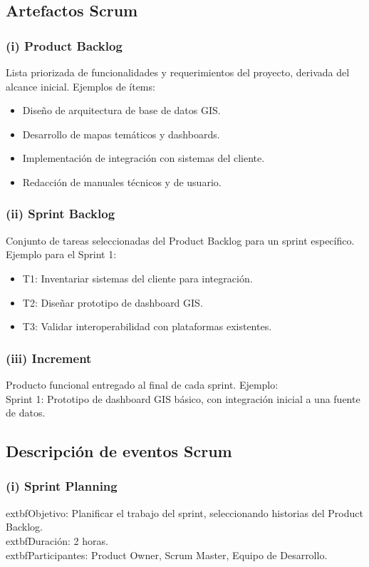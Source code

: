 \subsection{Artefactos Scrum}
\subsubsection{(i) Product Backlog}
Lista priorizada de funcionalidades y requerimientos del proyecto, derivada del alcance inicial. Ejemplos de ítems:
\begin{itemize}
  \item Diseño de arquitectura de base de datos GIS.
  \item Desarrollo de mapas temáticos y dashboards.
  \item Implementación de integración con sistemas del cliente.
  \item Redacción de manuales técnicos y de usuario.
\end{itemize}

\subsubsection{(ii) Sprint Backlog}
Conjunto de tareas seleccionadas del Product Backlog para un sprint específico. Ejemplo para el Sprint 1:
\begin{itemize}
  \item T1: Inventariar sistemas del cliente para integración.
  \item T2: Diseñar prototipo de dashboard GIS.
  \item T3: Validar interoperabilidad con plataformas existentes.
\end{itemize}

\subsubsection{(iii) Increment}
Producto funcional entregado al final de cada sprint. Ejemplo: \\Sprint 1: Prototipo de dashboard GIS básico, con integración inicial a una fuente de datos.

\subsection{Descripción de eventos Scrum}
\subsubsection{(i) Sprint Planning}
	extbf{Objetivo:} Planificar el trabajo del sprint, seleccionando historias del Product Backlog.\\
	extbf{Duración:} 2 horas.\\
	extbf{Participantes:} Product Owner, Scrum Master, Equipo de Desarrollo.

